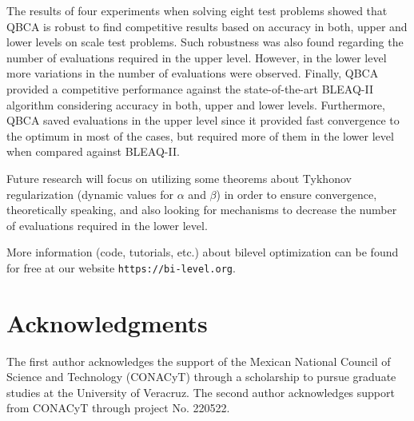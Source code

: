 \documentclass[conference]{IEEEtran}
\theoremstyle{definition}
\begin{document}
The results of four experiments when solving eight test problems showed that QBCA
is robust to find competitive results based on accuracy in both, upper and lower
levels on scale test problems. Such robustness was also found regarding the number
of evaluations required in the upper level. However, in the lower level more variations
in the number of evaluations were observed. Finally, QBCA provided a competitive
performance against the state-of-the-art BLEAQ-II algorithm considering accuracy
in both, upper and lower levels. Furthermore, QBCA saved evaluations in the upper
level since it provided fast convergence to the optimum in most of the cases, but
required more of them in the lower level when compared against BLEAQ-II. 

Future research will focus on utilizing some theorems about Tykhonov regularization
(dynamic values for $\alpha$ and $\beta$) in order to ensure convergence, theoretically
speaking, and also looking for mechanisms to decrease the number of evaluations
required in the lower level.

More information (code, tutorials, etc.) about bilevel optimization can be found
for free at our website \verb|https://bi-level.org|.


\section*{Acknowledgments} %
The first author acknowledges the support of the Mexican National Council of Science
and Technology (CONACyT) through a scholarship to pursue graduate studies at the
University of Veracruz. The second author acknowledges support from CONACyT through
project No. 220522. 






\end{document}
